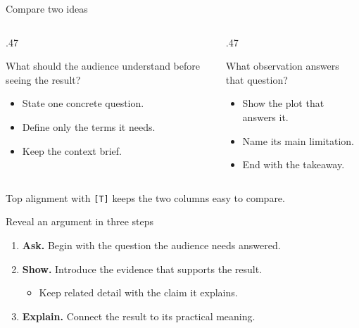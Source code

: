 \begin{frame}{Compare two ideas}
  \begin{columns}[T,onlytextwidth]
    \begin{column}{.47\textwidth}
      \medskip

      What should the audience understand before seeing the result?
      \begin{itemize}
        \item State one concrete question.
        \item Define only the terms it needs.
        \item Keep the context brief.
      \end{itemize}
    \end{column}
    \begin{column}{.47\textwidth}
      \medskip

      What observation answers that question?
      \begin{itemize}
        \item Show the plot that answers it.
        \item Name its main limitation.
        \item End with the takeaway.
      \end{itemize}
    \end{column}
  \end{columns}
  \medskip
  \begin{information}
    Top alignment with \texttt{[T]} keeps the two columns easy to compare.
  \end{information}
\end{frame}

\begin{frame}{Reveal an argument in three steps}
  \begin{enumerate}
    \item<1-> \textbf{Ask.} Begin with the question the audience needs answered.
    \item<2-> \textbf{Show.} Introduce the evidence that supports the result.
      \begin{itemize}
        \item<2-> Keep related detail with the claim it explains.
      \end{itemize}
    \item<3-> \textbf{Explain.} Connect the result to its practical meaning.
  \end{enumerate}
  \medskip
\end{frame}

